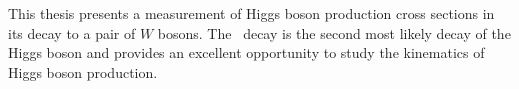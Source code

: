 This thesis presents a measurement of Higgs boson production cross sections in its decay to a pair of $W$ bosons. The \HWW\ decay is the second most likely decay of the Higgs boson and provides an excellent opportunity to study the kinematics of Higgs boson production. 















